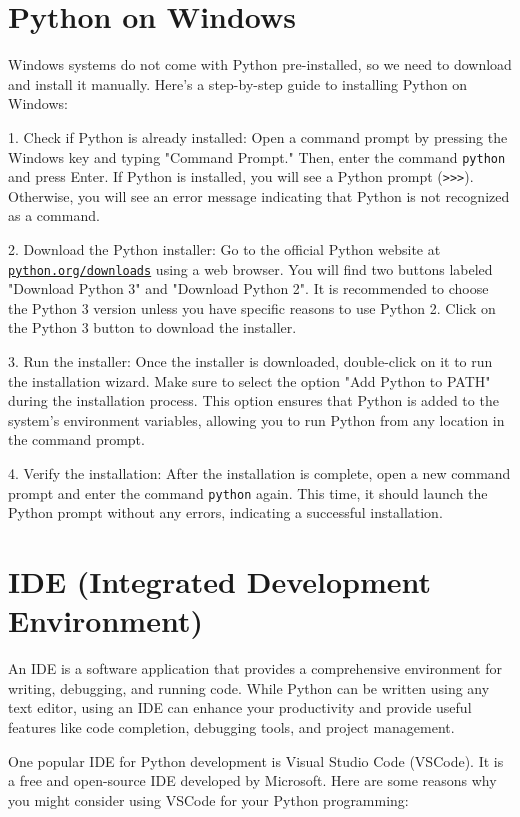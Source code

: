 \documentclass[12pt]{book}
\begin{document}
\section{Python on Windows}

Windows systems do not come with Python pre-installed, so we need to download and install it manually. Here's a step-by-step guide to installing Python on Windows:

1. Check if Python is already installed: Open a command prompt by pressing the Windows key and typing "Command Prompt." Then, enter the command \texttt{python} and press Enter. If Python is installed, you will see a Python prompt (\texttt{>>>}). Otherwise, you will see an error message indicating that Python is not recognized as a command.

2. Download the Python installer: Go to the official Python website at  \texttt{{\href{https://www.python.org/downloads}{python.org/downloads}}}  using a web browser. You will find two buttons labeled "Download Python 3" and "Download Python 2". It is recommended to choose the Python 3 version unless you have specific reasons to use Python 2. Click on the Python 3 button to download the installer.

3. Run the installer: Once the installer is downloaded, double-click on it to run the installation wizard. Make sure to select the option "Add Python to PATH" during the installation process. This option ensures that Python is added to the system's environment variables, allowing you to run Python from any location in the command prompt.

4. Verify the installation: After the installation is complete, open a new command prompt and enter the command \texttt{python} again. This time, it should launch the Python prompt without any errors, indicating a successful installation.



\section{IDE (Integrated Development Environment)}
An IDE is a software application that provides a comprehensive environment for writing, debugging, and running code. While Python can be written using any text editor, using an IDE can enhance your productivity and provide useful features like code completion, debugging tools, and project management.

One popular IDE for Python development is Visual Studio Code (VSCode). It is a free and open-source IDE developed by Microsoft. Here are some reasons why you might consider using VSCode for your Python programming:
\end{document}
